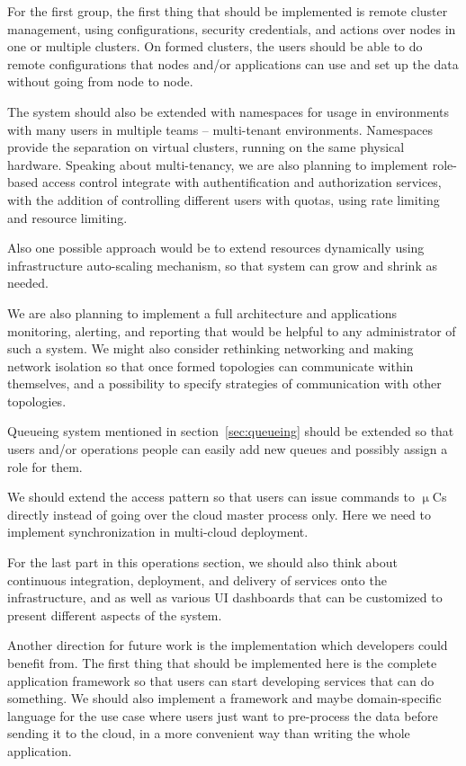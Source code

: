 \noindent
For the first group, the first thing that should be implemented is remote cluster management, using configurations, security credentials, and actions over nodes in one or multiple clusters. On formed clusters, the users should be able to do remote configurations that nodes and/or applications can use and set up the data without going from node to node.

The system should also be extended with namespaces for usage in environments with many users in multiple teams -- multi-tenant environments. Namespaces provide the separation on virtual clusters, running on the same physical hardware. Speaking about multi-tenancy, we are also planning to implement role-based access control integrate with authentification and authorization services, with the addition of controlling different users with quotas, using rate limiting and resource limiting.

Also one possible approach would be to extend resources dynamically using infrastructure auto-scaling mechanism, so that system can grow and shrink as needed.

We are also planning to implement a full architecture and applications monitoring, alerting, and reporting that would be helpful to any administrator of such a system. We might also consider rethinking networking and making network isolation so that once formed topologies can communicate within themselves, and a possibility to specify 
strategies of communication with other topologies.

Queueing system mentioned in section~\ref{sec:queueing} should be extended so that users and/or operations people can easily add new queues and possibly assign a role for them.

We should extend the access pattern so that users can issue commands to $\upmu$Cs directly instead of going over the cloud master process only. Here we need to implement synchronization in multi-cloud deployment.

For the last part in this operations section, we should also think about continuous integration, deployment, and delivery of services onto the infrastructure, and as well as various UI dashboards that can be customized to present different aspects of the system.

Another direction for future work is the implementation which developers could benefit from. The first thing that should be implemented here is the complete application framework so that users can start developing services that can do something. We should also implement a framework and maybe domain-specific language for the use case where users just want to pre-process the data before sending it to the cloud, in a more convenient way than writing the whole application.

